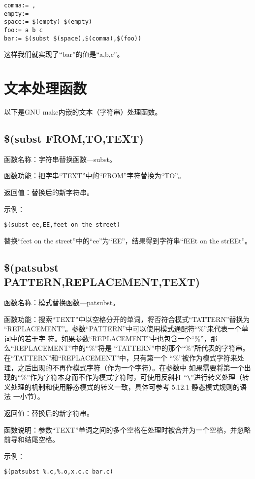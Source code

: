 \begin{Verbatim}[]
comma:= ,
empty:=
space:= $(empty) $(empty)
foo:= a b c
bar:= $(subst $(space),$(comma),$(foo))
\end{Verbatim}

这样我们就实现了“bar”的值是“a,b,c”。

\section{文本处理函数}
以下是GNU make内嵌的文本（字符串）处理函数。

\subsection{\$(subst FROM,TO,TEXT)}
函数名称：字符串替换函数—subst。

函数功能：把字串“TEXT”中的“FROM”字符替换为“TO”。

返回值：替换后的新字符串。

示例：
\begin{Verbatim}[]
$(subst ee,EE,feet on the street)
\end{Verbatim}

替换“feet on the street”中的“ee”为“EE”，结果得到字符串“fEEt on the strEEt”。

\subsection{\$(patsubst PATTERN,REPLACEMENT,TEXT)}
函数名称：模式替换函数—patsubst。

函数功能：搜索“TEXT”中以空格分开的单词，将否符合模式“TATTERN”替换为
“REPLACEMENT”。参数“PATTERN”中可以使用模式通配符“\%”来代表一个单词中的若干字
符。如果参数“REPLACEMENT”中也包含一个“\%”，那么“REPLACEMENT”中的“\%”将是
“TATTERN”中的那个“\%”所代表的字符串。在“TATTERN”和“REPLACEMENT”中，只有第一个
“\%”被作为模式字符来处理，之后出现的不再作模式字符（作为一个字符）。在参数中
如果需要将第一个出现的“\%”作为字符本身而不作为模式字符时，可使用反斜杠
“\verb"\"”进行转义处理（转义处理的机制和使用静态模式的转义一致，具体可参考
5.12.1 静态模式规则的语法 一小节）。

返回值：替换后的新字符串。

函数说明：参数“TEXT”单词之间的多个空格在处理时被合并为一个空格，并忽略前导和结尾空格。

示例：
\begin{Verbatim}[]
$(patsubst %.c,%.o,x.c.c bar.c)
\end{Verbatim}

